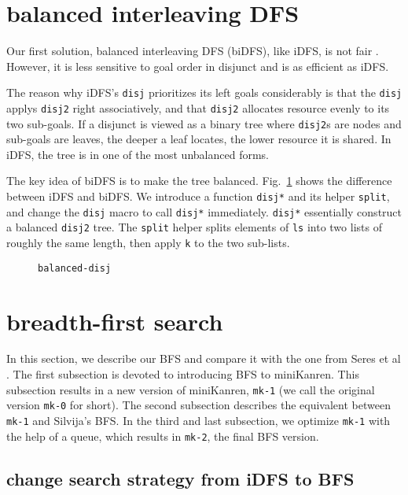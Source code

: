 \documentclass[format=acmlarge, review=true, authordraft=true]{acmart}
\begin{document}
\section{balanced interleaving DFS}

Our first solution, balanced interleaving DFS (biDFS), like iDFS, is not fair . However, it is less sensitive to goal order in disjunct and is as efficient as iDFS. 

The reason why iDFS's \texttt{disj} prioritizes its left goals considerably is that the \texttt{disj} applys \texttt{disj2} right associatively, and that 
\texttt{disj2} allocates resource evenly to its two sub-goals. If a disjunct 
is viewed as a binary tree where \texttt{disj2}s are nodes and sub-goals are 
leaves, the deeper a leaf locates, the lower resource it is shared. In iDFS, the tree is in one of the most unbalanced forms. 

The key idea of biDFS is to make the tree balanced. Fig.~\ref{balanced-disj} shows the difference between iDFS and biDFS. We introduce a function \texttt{disj*} and its helper \texttt{split}, and change the \texttt{disj} macro to call \texttt{disj*} immediately. \texttt{disj*} essentially construct a balanced \texttt{disj2} tree. The \texttt{split} helper splits elements of \texttt{ls} into two lists of roughly the same length, then apply \texttt{k} to the two sub-lists.

\begin{figure}
  
  \caption{\texttt{balanced-disj}}
  \label{balanced-disj}
\end{figure}



\section{breadth-first search}

In this section, we describe our BFS and compare it with the one from Seres et 
al \citep{seres1999algebra}. The first subsection is devoted to introducing BFS to miniKanren. This subsection results in a new version of miniKanren, \texttt{mk-1} (we call the original version \texttt{mk-0} for short). The second subsection describes the equivalent between \texttt{mk-1} and Silvija's BFS. In the third and last subsection, we optimize \texttt{mk-1} with the help of a queue, which results in \texttt{mk-2}, the final BFS version.

\subsection{change search strategy from iDFS to BFS}
\end{document}
